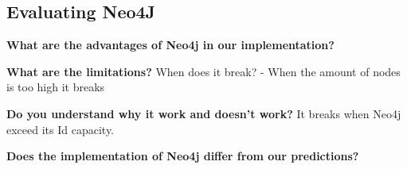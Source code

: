 \subsection{Evaluating Neo4J}


\textbf{What are the advantages of Neo4j in our implementation?}

\textbf{What are the limitations?}
When does it break? - When the amount of nodes is too high it breaks

\textbf{Do you understand why it work and doesn't work?}
It breaks when Neo4j exceed its Id capacity.

\textbf{Does the implementation of Neo4j differ from our predictions?}

